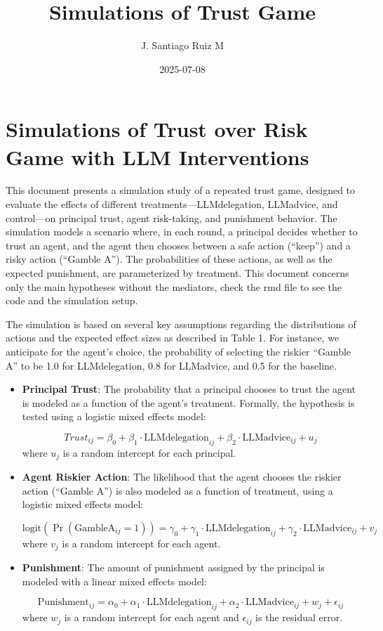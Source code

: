\documentclass[
]{article}
\title{Simulations of Trust Game}
\author{J. Santiago Ruiz M}
\date{2025-07-08}
\begin{document}
\maketitle

\section{Simulations of Trust over Risk Game with LLM
Interventions}\label{simulations-of-trust-over-risk-game-with-llm-interventions}

This document presents a simulation study of a repeated trust game,
designed to evaluate the effects of different
treatments---LLMdelegation, LLMadvice, and control---on principal trust,
agent risk-taking, and punishment behavior. The simulation models a
scenario where, in each round, a principal decides whether to trust an
agent, and the agent then chooses between a safe action (``keep'') and a
risky action (``Gamble A''). The probabilities of these actions, as well
as the expected punishment, are parameterized by treatment. This
document concerns only the main hypotheses without the mediators, check
the rmd file to see the code and the simulation setup.

The simulation is based on several key assumptions regarding the
distributions of actions and the expected effect sizes as described in
Table 1. For instance, we anticipate for the agent's choice, the
probability of selecting the riskier ``Gamble A'' to be 1.0 for
LLMdelegation, 0.8 for LLMadvice, and 0.5 for the baseline.

\begin{itemize}
\item
  \textbf{Principal Trust}: The probability that a principal chooses to
  trust the agent is modeled as a function of the agent's treatment.
  Formally, the hypothesis is tested using a logistic mixed effects
  model:

  \[
  Trust_{ij} = \beta_0 + \beta_1 \cdot \text{LLMdelegation}_{ij} + \beta_2 \cdot \text{LLMadvice}_{ij} + u_j
  \] where \(u_j\) is a random intercept for each principal.
\item
  \textbf{Agent Riskier Action}: The likelihood that the agent chooses
  the riskier action (``Gamble A'') is also modeled as a function of
  treatment, using a logistic mixed effects model:

  \[
  \text{logit}(\Pr(\text{GambleA}_{ij} = 1)) = \gamma_0 + \gamma_1 \cdot \text{LLMdelegation}_{ij} + \gamma_2 \cdot \text{LLMadvice}_{ij} + v_j
  \] where \(v_j\) is a random intercept for each agent.
\item
  \textbf{Punishment}: The amount of punishment assigned by the
  principal is modeled with a linear mixed effects model:

  \[
  \text{Punishment}_{ij} = \alpha_0 + \alpha_1 \cdot \text{LLMdelegation}_{ij} + \alpha_2 \cdot \text{LLMadvice}_{ij} + w_j + \epsilon_{ij}
  \] where \(w_j\) is a random intercept for each agent and
  \(\epsilon_{ij}\) is the residual error.
\end{itemize}
\end{document}
